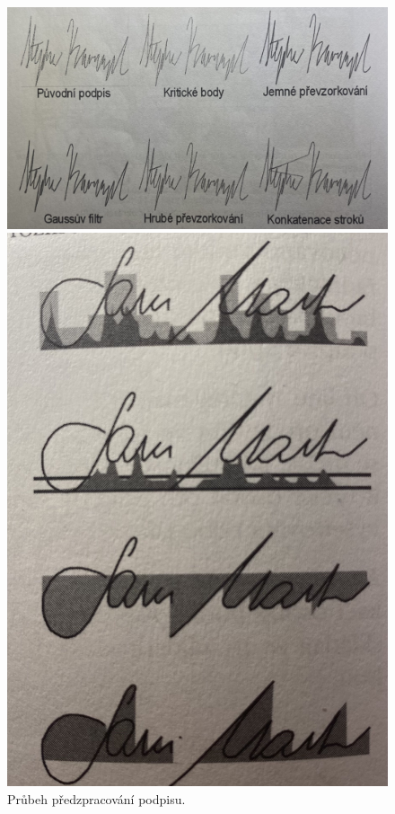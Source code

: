 \begin{figure}[H]
  \centering
  \begin{minipage}{1\textwidth}
    \centering
    \includegraphics[width=\textwidth]{obrazky-figures/predzpracovany.jpg}
    \caption{Průbeh předzpracování podpisu.~\cite{DrahanskýMartin2011}}
    \label{fig:predzpracovany_podpis}
  \end{minipage}\hfill
  \begin{minipage}{0.35\textwidth}
    \centering
    \includegraphics[width=\textwidth]{obrazky-figures/extrahovane.jpg}

\end{minipage}
\end{figure}
